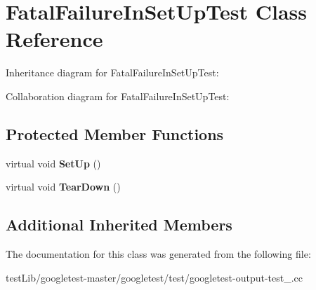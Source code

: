 \hypertarget{classFatalFailureInSetUpTest}{}\section{Fatal\+Failure\+In\+Set\+Up\+Test Class Reference}
\label{classFatalFailureInSetUpTest}


Inheritance diagram for Fatal\+Failure\+In\+Set\+Up\+Test\+:


Collaboration diagram for Fatal\+Failure\+In\+Set\+Up\+Test\+:
\subsection*{Protected Member Functions}
\begin{DoxyCompactItemize}
\item 
\mbox{\label{classFatalFailureInSetUpTest_a455696f86fb5f5393624221ccb79b373}} 
virtual void {\bfseries Set\+Up} ()
\item 
\mbox{\label{classFatalFailureInSetUpTest_a457707161063e08f7b6600ec5db449e4}} 
virtual void {\bfseries Tear\+Down} ()
\end{DoxyCompactItemize}
\subsection*{Additional Inherited Members}


The documentation for this class was generated from the following file\+:\begin{DoxyCompactItemize}
\item 
test\+Lib/googletest-\/master/googletest/test/googletest-\/output-\/test\+\_\+.\+cc\end{DoxyCompactItemize}
